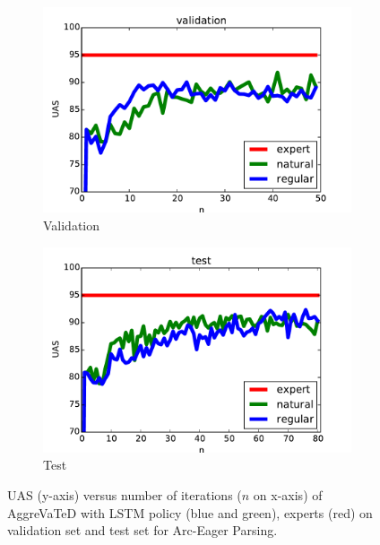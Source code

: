 \documentclass{article}
\begin{document}
\begin{figure}[t!]
	\centering
	\vspace{-2mm}
	\begin{subfigure}[l]{0.238\textwidth}
        \includegraphics[width=1.11\textwidth,keepaspectratio]{./figure/eager_validation_comparison.pdf}
        \caption{Validation}
        \label{fig:cartpole}
    \end{subfigure}
	\begin{subfigure}[l]{0.238\textwidth}
        \includegraphics[width=1.11\textwidth,keepaspectratio]{./figure/eager_test_comparison_2.pdf}
        \caption{Test}
        \label{fig:acrobot}
    \end{subfigure}
    \caption{UAS (y-axis) versus number of iterations ($n$ on x-axis) of AggreVaTeD with LSTM policy (blue and green), experts (red) on validation set and test set for Arc-Eager Parsing. }
    \label{fig:perf_eager}
    \vspace{-0.25in}
\end{figure}
\end{document}
